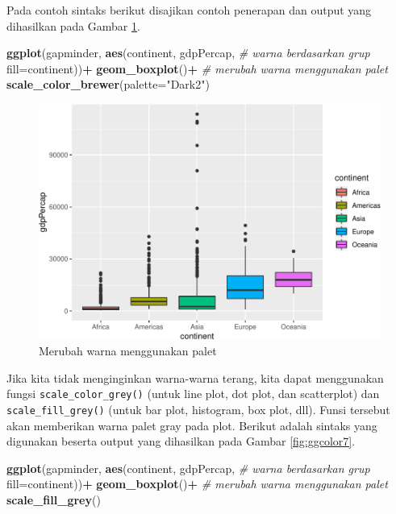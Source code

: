 \documentclass[]{book}
\newenvironment{Shaded}{\begin{snugshade}}{\end{snugshade}}
\newcommand{\KeywordTok}[1]{\textcolor[rgb]{0.13,0.29,0.53}{\textbf{#1}}}
\newcommand{\DataTypeTok}[1]{\textcolor[rgb]{0.13,0.29,0.53}{#1}}
\newcommand{\StringTok}[1]{\textcolor[rgb]{0.31,0.60,0.02}{#1}}
\newcommand{\CommentTok}[1]{\textcolor[rgb]{0.56,0.35,0.01}{\textit{#1}}}
\newcommand{\OperatorTok}[1]{\textcolor[rgb]{0.81,0.36,0.00}{\textbf{#1}}}
\newcommand{\NormalTok}[1]{#1}
\begin{document}
Pada contoh sintaks berikut disajikan contoh penerapan dan output yang
dihasilkan pada Gambar \ref{fig:ggcolor6}.

\begin{Shaded}
\begin{Highlighting}[]
\KeywordTok{ggplot}\NormalTok{(gapminder, }\KeywordTok{aes}\NormalTok{(continent, gdpPercap, }
                      \CommentTok{# warna berdasarkan grup}
                      \DataTypeTok{fill=}\NormalTok{continent))}\OperatorTok{+}
\StringTok{  }\KeywordTok{geom_boxplot}\NormalTok{()}\OperatorTok{+}
\StringTok{  }\CommentTok{# merubah warna menggunakan palet}
\StringTok{  }\KeywordTok{scale_color_brewer}\NormalTok{(}\DataTypeTok{palette=}\StringTok{"Dark2"}\NormalTok{)}
\end{Highlighting}
\end{Shaded}

\begin{figure}

{\centering \includegraphics[width=0.7\linewidth]{EnvStat_files/figure-latex/ggcolor6-1} 

}

\caption{Merubah warna menggunakan palet}\label{fig:ggcolor6}
\end{figure}

Jika kita tidak menginginkan warna-warna terang, kita dapat menggunakan
fungsi \texttt{scale\_color\_grey()} (untuk line plot, dot plot, dan
scatterplot) dan \texttt{scale\_fill\_grey()} (untuk bar plot,
histogram, box plot, dll). Funsi tersebut akan memberikan warna palet
gray pada plot. Berikut adalah sintaks yang digunakan beserta output
yang dihasilkan pada Gambar \ref{fig:ggcolor7}.

\begin{Shaded}
\begin{Highlighting}[]
\KeywordTok{ggplot}\NormalTok{(gapminder, }\KeywordTok{aes}\NormalTok{(continent, gdpPercap, }
                      \CommentTok{# warna berdasarkan grup}
                      \DataTypeTok{fill=}\NormalTok{continent))}\OperatorTok{+}
\StringTok{  }\KeywordTok{geom_boxplot}\NormalTok{()}\OperatorTok{+}
\StringTok{  }\CommentTok{# merubah warna menggunakan palet}
\StringTok{  }\KeywordTok{scale_fill_grey}\NormalTok{()}
\end{Highlighting}
\end{Shaded}
\end{document}
